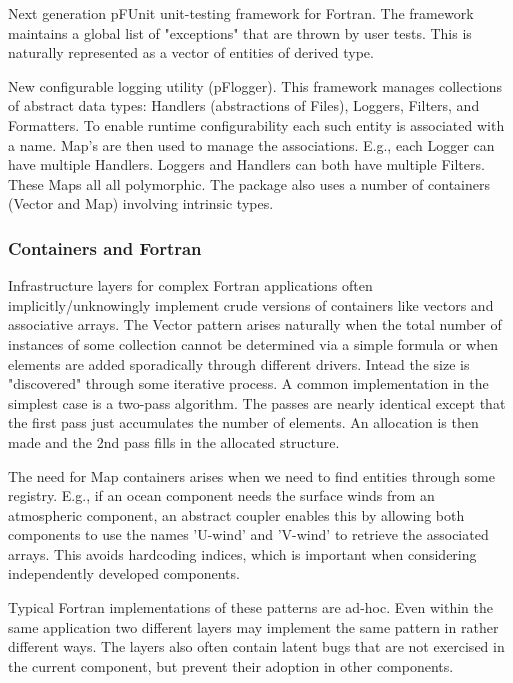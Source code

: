 \documentclass{article}
\begin{document}
 Next generation pFUnit unit-testing framework for Fortran.  The  framework maintains a global list of "exceptions" that are thrown by user tests.  This is naturally represented as a vector of entities of derived type.

 New configurable logging utility (pFlogger).  This framework   manages collections of abstract data types: Handlers (abstractions   of Files), Loggers, Filters, and Formatters.  To enable runtime
   configurability each such entity is associated with a name.  Map's   are then used to manage the associations.  E.g., each Logger can   have multiple Handlers.  Loggers and Handlers can both have
   multiple Filters.  These Maps all all polymorphic.  The package   also uses a number of containers (Vector and Map) involving   intrinsic types.

\subsubsection{Containers and Fortran}

Infrastructure layers for complex Fortran applications often
implicitly/unknowingly implement crude versions of containers like
vectors and associative arrays.  The Vector pattern arises naturally
when the total number of instances of some collection cannot be
determined via a simple formula or when elements are added
sporadically through different drivers.  Intead the size is
"discovered" through some iterative process.  A common implementation
in the simplest case is a two-pass algorithm.  The passes are nearly
identical except that the first pass just accumulates the number of
elements.  An allocation is then made and the 2nd pass fills in the
allocated structure.

The need for Map containers arises when we need to find entities
through some registry.  E.g., if an ocean component needs the surface
winds from an atmospheric component, an abstract coupler enables this
by allowing both components to use the names 'U-wind' and 'V-wind' to
retrieve the associated arrays.  This avoids hardcoding indices, which
is important when considering independently developed components.

Typical Fortran implementations of these patterns are ad-hoc.  Even
within the same application two different layers may implement the
same pattern in rather different ways.  The layers also often contain
latent bugs that are not exercised in the current component, but
prevent their adoption in other components.
\end{document}
